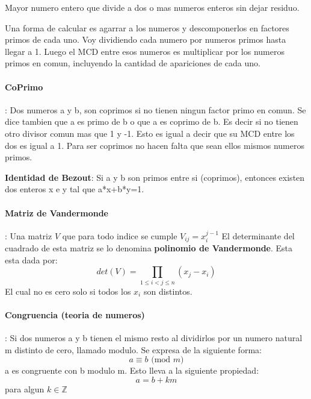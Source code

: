 \documentclass[12pt, oneside]{article}
\newcommand{\Z}{\mathbb{Z}}
\begin{document}
Mayor numero entero que divide a dos o mas numeros enteros sin dejar residuo.

Una forma de calcular es agarrar a los numeros y descomponerlos en factores primos de cada uno.
Voy dividiendo cada numero por numeros primos hasta llegar a 1.
Luego el MCD entre esos numeros es multiplicar por los numeros primos en comun, incluyendo
la cantidad de apariciones de cada uno.

\vspace{0.3cm}
\paragraph{CoPrimo}:
Dos numeros a y b, son coprimos si no tienen ningun factor primo en comun.
Se dice tambien que a es primo de b o que a es coprimo de b.
Es decir si no tienen otro divisor comun mas que 1 y -1.
Esto es igual a decir que su MCD entre los dos es igual a 1.
Para ser coprimos no hacen falta que sean ellos mismos numeros primos.

\textbf{Identidad de Bezout}: Si a y b son primos entre si (coprimos), entonces existen dos enteros x e y tal
que a*x+b*y=1.
\vspace{0.3cm}

\paragraph{Matriz de Vandermonde}:
Una matriz $V$ que para todo indice se cumple $V_{ij}=x_i^{j-1}$
El determinante del cuadrado de esta matriz se lo denomina \textbf{polinomio de Vandermonde}.
Esta esta dada por:
\begin{equation*}
  det(V) = \prod_{1\leq i < j \leq n}(x_j-x_i)
\end{equation*}
El cual no es cero solo si todos los $x_i$ son distintos.

\vspace{0.3cm}
\paragraph{Congruencia (teoria de numeros)}:
Si dos numeros a y b tienen el mismo resto al dividirlos por un numero natural
m distinto de cero, llamado modulo.
Se expresa de la siguiente forma:
\begin{equation*}
a \equiv b \text{ (mod } m)
\end{equation*}
a es congruente con b modulo m.
Esto lleva a la siguiente propiedad:
\begin{equation*}
  a = b + km
\end{equation*}
para algun $k\in \Z$
\end{document}
